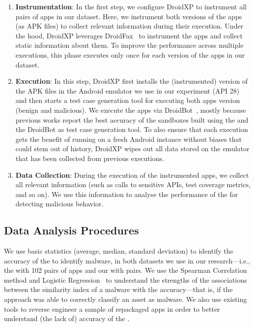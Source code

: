 \begin{enumerate}[S1]
 \item \textbf{Instrumentation}: In the first step,
we configure DroidXP to instrument all pairs of apps in our dataset.
Here, we instrument both versions of the apps (as APK files) to collect relevant information during their execution. Under the hood, DroidXP leverages
DroidFax~\cite{DBLP:conf/icsm/CaiR17a} to instrument the apps and collect static
information about them. To improve the performance across multiple executions,
this phase executes only once for each version of the apps in our dataset.

\item \textbf{Execution}: In this step, DroidXP first installs the (instrumented) version of the APK files in the Android emulator we use in our experiment (API 28) and then starts a test case generation tool for executing both apps version (benign and malicious). We execute the apps via DroidBot~\cite{DBLP:conf/icse/LiYGC17}, mostly because previous works report the best accuracy of the sandboxes built using the \mas and the DroidBot as test case generation tool. To also ensure that each execution gets the benefit of running on a fresh Android instance without biases that could stem out of history, DroidXP wipes out all data stored on the emulator that has been collected from previous executions.


\item \textbf{Data Collection}: During the execution of the instrumented apps, we collect all relevant information (such as calls to sensitive APIs, test coverage metrics, and so on). We use this information to analyse the performance of the \mas for detecting malicious behavior.
\end{enumerate}

\subsection{Data Analysis Procedures} \label{sec:dataAnalysisProc}

We use basic statistics (average, median, standard deviation) to identify the
accuracy of the \mas to identify malware, in both
datasets we use in our research---i.e., the \sds
with 102 pairs of apps and our \cds with
\apps pairs. We use the Spearman Correlation~\cite{spearman-correlation} method and
Logistic Regression~\cite{statistical-learning} to understand the strengths of
the associations between the similarity index of a
malware with the \mas accuracy---that is,
if the approach was able to correctly classify an asset as malware. We also use existing tools to reverse engineer a sample of repackaged
apps in order to better understand (the lack of) accuracy
of the \mas.

